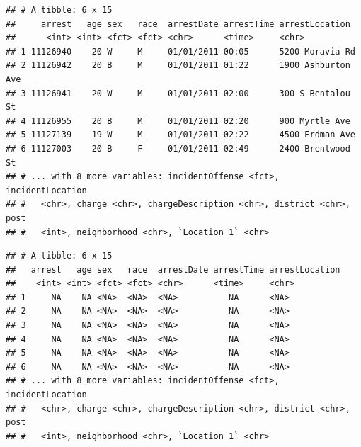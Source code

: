 \documentclass[12pt,]{book}
\newenvironment{Shaded}{\begin{snugshade}}{\end{snugshade}}
\newcommand{\KeywordTok}[1]{\textcolor[rgb]{0.13,0.29,0.53}{\textbf{#1}}}
\newcommand{\DecValTok}[1]{\textcolor[rgb]{0.00,0.00,0.81}{#1}}
\newcommand{\StringTok}[1]{\textcolor[rgb]{0.31,0.60,0.02}{#1}}
\newcommand{\CommentTok}[1]{\textcolor[rgb]{0.56,0.35,0.01}{\textit{#1}}}
\newcommand{\OperatorTok}[1]{\textcolor[rgb]{0.81,0.36,0.00}{\textbf{#1}}}
\newcommand{\NormalTok}[1]{#1}
\theoremstyle{definition}
\theoremstyle{definition}
\theoremstyle{definition}
\theoremstyle{remark}
\begin{document}
\begin{verbatim}
## # A tibble: 6 x 15
##     arrest   age sex   race  arrestDate arrestTime arrestLocation    
##      <int> <int> <fct> <fct> <chr>      <time>     <chr>             
## 1 11126940    20 W     M     01/01/2011 00:05      5200 Moravia Rd   
## 2 11126942    20 B     M     01/01/2011 01:22      1900 Ashburton Ave
## 3 11126941    20 W     M     01/01/2011 02:00      300 S Bentalou St 
## 4 11126955    20 B     M     01/01/2011 02:20      900 Myrtle Ave    
## 5 11127139    19 W     M     01/01/2011 02:22      4500 Erdman Ave   
## 6 11127003    20 B     F     01/01/2011 02:49      2400 Brentwood St 
## # ... with 8 more variables: incidentOffense <fct>, incidentLocation
## #   <chr>, charge <chr>, chargeDescription <chr>, district <chr>, post
## #   <int>, neighborhood <chr>, `Location 1` <chr>
\end{verbatim}

\begin{Shaded}
\end{Shaded}

\begin{verbatim}
## # A tibble: 6 x 15
##   arrest   age sex   race  arrestDate arrestTime arrestLocation
##    <int> <int> <fct> <fct> <chr>      <time>     <chr>         
## 1     NA    NA <NA>  <NA>  <NA>          NA      <NA>          
## 2     NA    NA <NA>  <NA>  <NA>          NA      <NA>          
## 3     NA    NA <NA>  <NA>  <NA>          NA      <NA>          
## 4     NA    NA <NA>  <NA>  <NA>          NA      <NA>          
## 5     NA    NA <NA>  <NA>  <NA>          NA      <NA>          
## 6     NA    NA <NA>  <NA>  <NA>          NA      <NA>          
## # ... with 8 more variables: incidentOffense <fct>, incidentLocation
## #   <chr>, charge <chr>, chargeDescription <chr>, district <chr>, post
## #   <int>, neighborhood <chr>, `Location 1` <chr>
\end{verbatim}

\begin{Shaded}
\end{Shaded}
\end{document}

